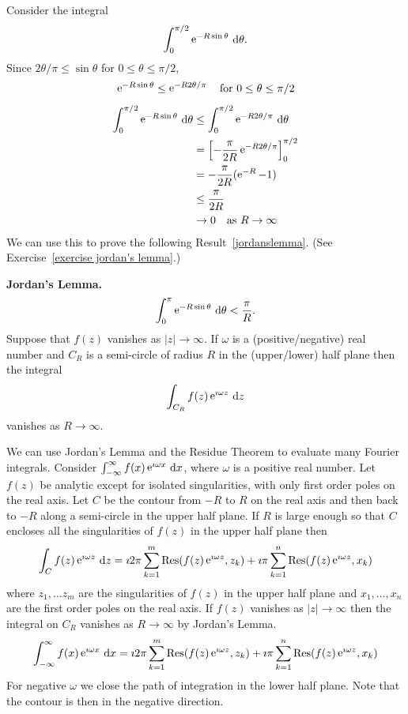 Consider the integral
\[
\int_0^{\pi/2} \mathop{\mathrm{e}}\nolimits^{-R \sin \theta} \,\mathrm{d} \theta.
\]
Since $2 \theta / \pi \leq \sin\theta$ for $0 \leq \theta \leq \pi/2$,
\[
\mathop{\mathrm{e}}\nolimits^{-R \sin \theta} \leq \mathop{\mathrm{e}}\nolimits^{-R 2 \theta / \pi} \quad \mathrm{for}\ 0 \leq \theta \leq \pi/2
\]
\begin{align*}
  \int_0^{\pi/2} \mathop{\mathrm{e}}\nolimits^{-R \sin \theta} \,\mathrm{d} \theta
  &\leq \int_0^{\pi/2}\mathop{\mathrm{e}}\nolimits^{-R 2 \theta / \pi} \,\mathrm{d} \theta \\
  &= \left[ -\frac{\pi}{2R} \mathop{\mathrm{e}}\nolimits^{-R 2 \theta / \pi} \right]_0^{\pi/2} \\
  &=  -\frac{\pi}{2R} ( \mathop{\mathrm{e}}\nolimits^{-R} - 1 ) \\
  &\leq \frac{\pi}{2R} \\
  &\to 0 \quad \mathrm{as}\ R \to \infty
\end{align*}
We can use this to prove the following Result~\ref{jordanslemma}. 
(See Exercise~\ref{exercise jordan's lemma}.)

\begin{Result}
  \label{jordanslemma}
  \textbf{Jordan's Lemma.}
  \[
  \int_0^\pi \mathop{\mathrm{e}}\nolimits^{-R \sin\theta} \,\mathrm{d} \theta < \frac{\pi}{R}.
  \]
  Suppose that $f(z)$ vanishes as $|z| \to \infty$.
  If $\omega$ is a (positive/negative) real number and $C_R$ is a 
  semi-circle of radius $R$ in the (upper/lower) half plane then the integral
  \[
  \int_{C_R} f(z) \mathop{\mathrm{e}}\nolimits^{\imath \omega z} \,\mathrm{d} z
  \]
  vanishes as $R \to \infty$.
\end{Result}





We can use Jordan's Lemma and the Residue Theorem to evaluate many Fourier 
integrals.  Consider $\int_{-\infty}^\infty f(x) \mathop{\mathrm{e}}\nolimits^{\imath \omega x}\,\mathrm{d} x$,
where $\omega$ is a positive real number.
Let $f(z)$ be analytic except for isolated singularities, with only first 
order poles on the real axis.  Let $C$ be the contour from $-R$ to $R$ on
the real axis and then back to $-R$ along a semi-circle in the upper
half plane.  If $R$ is large enough so that $C$ encloses all the singularities
of $f(z)$ in the upper half plane then
\[
\int_C f(z) \mathop{\mathrm{e}}\nolimits^{\imath \omega z} \,\mathrm{d} z 
= \imath 2 \pi \sum_{k = 1}^m \mathop{\mathrm{Res}}\nolimits( f(z) \mathop{\mathrm{e}}\nolimits^{\imath \omega z}, z_k )
+ \imath \pi \sum_{k = 1}^n \mathop{\mathrm{Res}}\nolimits( f(z) \mathop{\mathrm{e}}\nolimits^{\imath \omega z}, x_k )
\]
where $z_1, \ldots z_m$ are the singularities of $f(z)$ in the upper half 
plane and $x_1, \ldots, x_n$ are the first order poles on the real axis.  
If $f(z)$ vanishes as $|z| \to \infty$ then the integral on $C_R$
vanishes as $R \to \infty$ by Jordan's Lemma.
\[
\int_{-\infty}^\infty f(x) \mathop{\mathrm{e}}\nolimits^{\imath \omega x} \,\mathrm{d} x
= \imath 2 \pi \sum_{k = 1}^m \mathop{\mathrm{Res}}\nolimits( f(z) \mathop{\mathrm{e}}\nolimits^{\imath \omega z}, z_k )
+ \imath \pi \sum_{k = 1}^n \mathop{\mathrm{Res}}\nolimits( f(z) \mathop{\mathrm{e}}\nolimits^{\imath \omega z}, x_k )
\]
For negative $\omega$ we close the path of integration in the lower half
plane.  Note that the contour is then in the negative direction.







